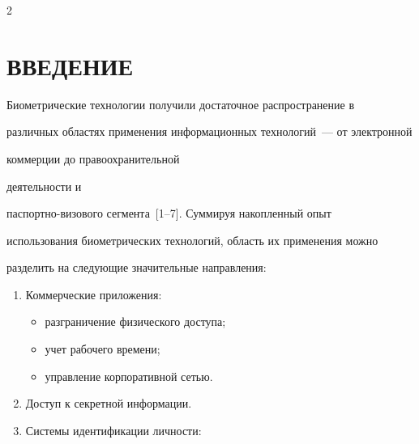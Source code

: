 


      \thispagestyle{headings}



      \begin{multicols}{2}



      \label{st\stat}





  \section{ВВЕДЕНИЕ}

  

  Биометрические технологии получили достаточное распространение в 

различных областях применения информационных технологий~--- от электронной 

коммерции до правоохранительной %

деятель\-ности и 

  пас\-порт\-но-ви\-зо\-во\-го сегмента~[1--7]. Суммируя накопленный опыт 

использования биометрических технологий, область их применения можно 

разделить на следующие значительные направления:

  \begin{enumerate}[1.]

  \item Коммерческие приложения:

  \begin{itemize}

\item разграничение физического доступа;

\item учет рабочего времени;

\item управление корпоративной сетью.

\end{itemize}

  \item  Доступ к секретной информации.

  \item Системы идентификации личности:

  \begin{itemize}


\end{itemize}
\end{enumerate}
\end{multicols}
